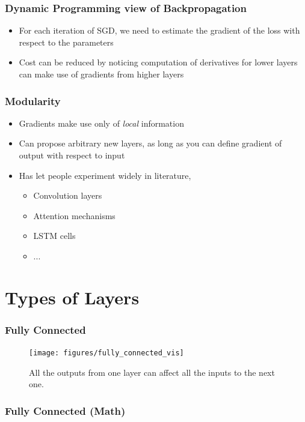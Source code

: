 \documentclass[10pt,mathserif]{beamer}
\begin{document}
\begin{frame}
  \frametitle{Dynamic Programming view of Backpropagation}
  \begin{itemize}
  \item For each iteration of SGD, we need to estimate the gradient of the loss
    with respect to the parameters
  \item Cost can be reduced by noticing computation of derivatives for lower
    layers can make use of gradients from higher layers
  \end{itemize}
  \begin{figure}
    \centering
    \caption{\label{fig:backprop_diagram} }
  \end{figure}
\end{frame}

\begin{frame}
  \frametitle{Modularity}
  \begin{itemize}
  \item Gradients make use only of \textit{local} information
  \item Can propose arbitrary new layers, as long as you can define gradient of
    output with respect to input
  \item Has let people experiment widely in literature,
    \begin{itemize}
    \item Convolution layers
    \item Attention mechanisms
    \item LSTM cells
    \item ...
    \end{itemize}
  \end{itemize} 
\end{frame}

\section{Types of Layers}

\begin{frame}
  \frametitle{Fully Connected}
\begin{figure}
  \centering
  \texttt{[image: figures/fully\_connected\_vis]}
  \caption{All the outputs from one layer can affect all the inputs to the next
    one. \label{fig:fully_connected}}
\end{figure}
\end{frame}

\begin{frame}
  \frametitle{Fully Connected (Math)}
\end{frame}
\end{document}

